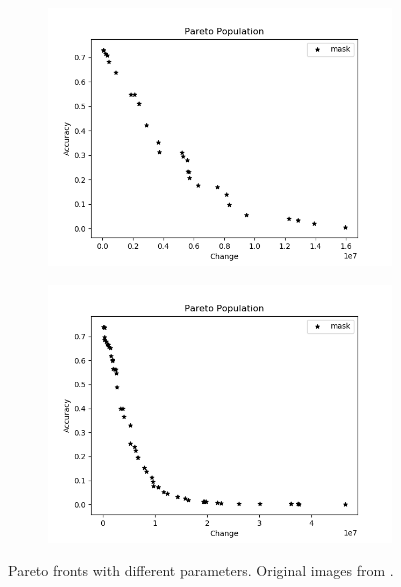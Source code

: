 \documentclass[conference]{IEEEtran}
\begin{document}
\begin{figure}[htbp]
\centering
\begin{subfigure}[t]{.4\textwidth}
  \centering
  \includegraphics[width=1\linewidth]{fig/paretoplot1.png}
\end{subfigure}
\begin{subfigure}[t]{.4\textwidth}
  \centering
  \includegraphics[width=1\linewidth]{fig/paretoplot2.png}
\end{subfigure}
\caption{Pareto fronts with different parameters. Original images from \cite{imagenet}.}
\label{fig:pareto_graphs}
\end{figure}
\end{document}

